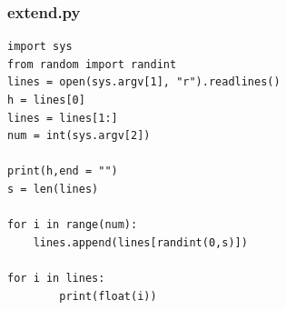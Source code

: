 \documentclass[12pt,a4paper]{article}
\begin{document}
\subsubsection*{extend.py}
\begin{lstlisting}
import sys
from random import randint
lines = open(sys.argv[1], "r").readlines()
h = lines[0]
lines = lines[1:]
num = int(sys.argv[2])

print(h,end = "")
s = len(lines)

for i in range(num):
    lines.append(lines[randint(0,s)])

for i in lines:
        print(float(i))


\end{lstlisting}
\pagebreak


    
\end{document}
